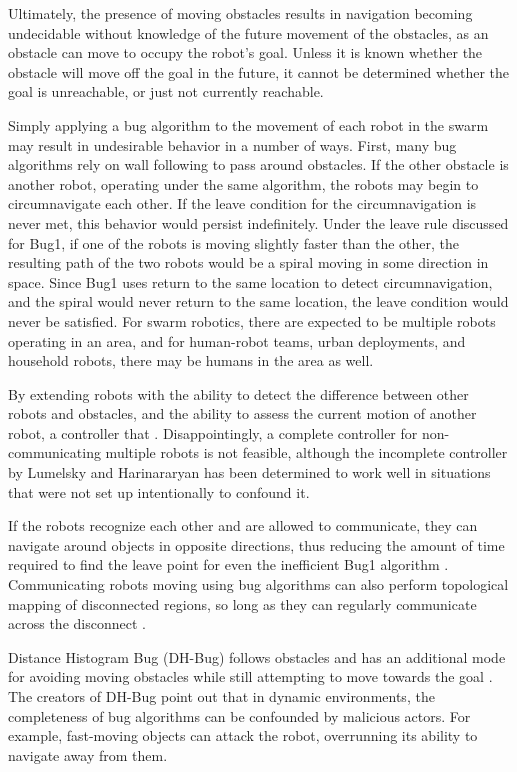 \documentclass[letterpaper, 10 pt, conference]{ieeeconf}  %
\begin{document}
Ultimately, the presence of moving obstacles results in navigation becoming undecidable  without knowledge of the future movement of the obstacles, as an obstacle can move to occupy the robot's goal. 
Unless it is known whether the obstacle will move off the goal in the future, it cannot be determined whether the goal is unreachable, or just not currently reachable. 

Simply applying a bug algorithm to the movement of each robot in the swarm may result in undesirable behavior in a number of ways. 
First, many bug algorithms rely on wall following to pass around obstacles. 
If the other obstacle is another robot, operating under the same algorithm, the robots may begin to circumnavigate each other. 
If the leave condition for the circumnavigation is never met, this behavior would persist indefinitely. 
Under the leave rule discussed for Bug1, if one of the robots is moving slightly faster than the other, the resulting path of the two robots would be a spiral moving in some direction in space. 
Since Bug1 uses return to the same location to detect circumnavigation, and the spiral would never return to the same location, the leave condition would never be satisfied.
For swarm robotics, there are expected to be multiple robots operating in an area, and for human-robot teams, urban deployments, and household robots, there may be humans in the area as well. 

By extending robots with the ability to detect the difference between other robots and obstacles, and the ability to assess the current motion of another robot, a controller that  \cite{lumelsky1997decentralized}. 
Disappointingly, a complete controller for non-communicating multiple robots is not feasible, although the incomplete controller by Lumelsky and Harinararyan has been determined to work well in situations that were not set up intentionally to confound it. 

If the robots recognize each other and are allowed to communicate, they can navigate around objects in opposite directions, thus reducing the amount of time required to find the leave point for even the inefficient Bug1 algorithm \cite{kandathil2018modified}.
Communicating robots moving using bug algorithms can also perform topological mapping of disconnected regions, so long as they can regularly communicate across the disconnect \cite{caccavale2017distributed}.

Distance Histogram Bug (DH-Bug) follows obstacles and has an additional mode for avoiding moving obstacles while still attempting to move towards the goal \cite{zhu2012new}. 
The creators of DH-Bug point out that in dynamic environments, the completeness of bug algorithms can be confounded by malicious actors. 
For example, fast-moving objects can attack the robot, overrunning its ability to navigate away from them. 
\end{document}
